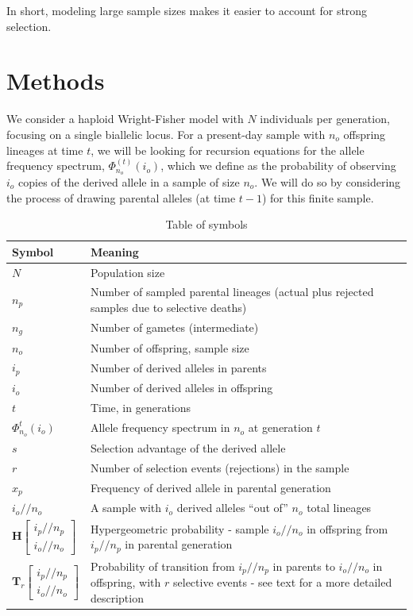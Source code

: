 \documentclass[review]{elsarticle}
\newcommand{\afs}[2]{\Phi_{#1}^{(#2)}}
\newcommand{\dslash}{/\!\!/}
\newcommand{\Coalc}[4]{\begin{bmatrix}#1\dslash #2 \\ #3\dslash #4 \end{bmatrix}}
\begin{document}
In short, modeling large sample sizes makes it easier to account for strong selection. 

\section{Methods}
\label{sec:methods}

We consider a haploid Wright-Fisher model with $N$ individuals per generation, focusing on a single
biallelic locus. For a present-day sample with $n_o$ offspring lineages at time $t$, we will be
looking for recursion equations for the allele frequency spectrum, $\afs{n_o}{t}(i_o)$, which we
define as the probability of observing $i_o$ copies of the derived allele in a sample of size $n_o$.
We will do so by considering the process of drawing parental alleles (at time $t-1$) for this finite
sample.

\begin{table}
  \centering
  \begin{tabular}{l|p{100mm}}
    Symbol & Meaning\\
    \hline
    $N$ & Population size\\
    $n_p$ & Number of sampled parental lineages (actual plus rejected samples due to selective deaths)\\
    $n_g$ & Number of gametes (intermediate)\\
    $n_o$ & Number of offspring, sample size\\
    $i_p$ & Number of derived alleles in parents\\
    $i_o$ & Number of derived alleles in offspring\\
    $t$ & Time, in generations\\
    $\Phi_{n_o}^{t}(i_o)$ & Allele frequency spectrum in $n_o$ at generation $t$\\
    $s$ & Selection advantage of the derived allele\\
    $r$ & Number of selection events (rejections) in the sample\\
    $x_p$ & Frequency of derived allele in parental generation\\
    $i_o \dslash n_o$ & A sample with $i_o$ derived alleles ``out of'' $n_o$ total lineages\\
    $\mathbf{H}\Coalc{i_p}{n_p}{i_o}{n_o}$ & Hypergeometric probability -
                                             sample $i_o \dslash n_o$ in offspring from $i_p \dslash n_p$ in parental generation\\
    $\mathbf{T}_{r}\Coalc{i_p}{n_p}{i_o}{n_o}$ & Probability of transition from $i_p \dslash n_p$ in parents
                                                 to $i_o \dslash n_o$ in offspring, with $r$ selective events -
                                                 see text for a more detailed description\\
  \end{tabular}
  \caption{\label{tab:symbols} Table of symbols}
\end{table}
\end{document}
